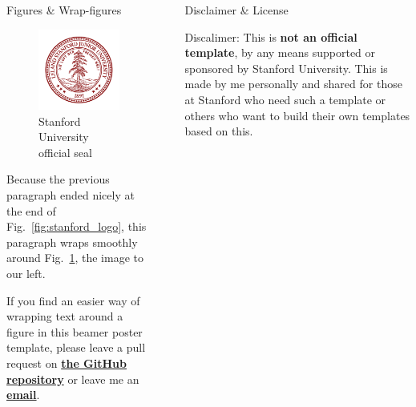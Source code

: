 \documentclass[final]{beamer}
\newlength{\sepwid}
\newlength{\secondcolwid}
\newlength{\thirdcolwid}
\newcommand{\emphg}[1]{{\color{paloalto}\textbf{#1}}}
\newcommand{\emphr}[1]{{\color{cardinalred}\textbf{#1}}}
\begin{document}
\begin{frame}[t]
\begin{columns}[t]
\begin{column}[t]{\secondcolwid}
\begin{block}{Figures \& Wrap-figures}
        \begin{figure}
        	\centering
            \includegraphics[width=8cm]{./img/SU_Seal_Red.png}
        	\caption{Stanford University official seal \cite{StanfordLogo}}
        	\label{fig:stanford_seal}
        \end{figure}
        
        Because the previous paragraph ended nicely at the end of Fig.~\ref{fig:stanford_logo}, this paragraph wraps smoothly around Fig.~\ref{fig:stanford_seal}, the image to our left.
        
        If you find an easier way of wrapping text around a figure in this beamer poster template, please leave a pull request on \emphg{\href{https://github.com/sanhacheong/stanford_beamer_poster}{the GitHub repository}} or leave me an \emphg{\href{mailto:sanha@stanford.edu}{email}}.

	\end{block}
	 
    
    
\end{column}

\begin{column}{\sepwid}\end{column}

\begin{column}[t]{\thirdcolwid}
	
	\begin{block}{Disclaimer \& License}
		
		Discalimer: This is \emphr{not an official template}, by any means supported or sponsored by Stanford University. This is made by me personally and shared for those at Stanford who need such a template or others who want to build their own templates based on this.
    

\end{block}
\end{column}
\end{columns}
\end{frame}
\end{document}
